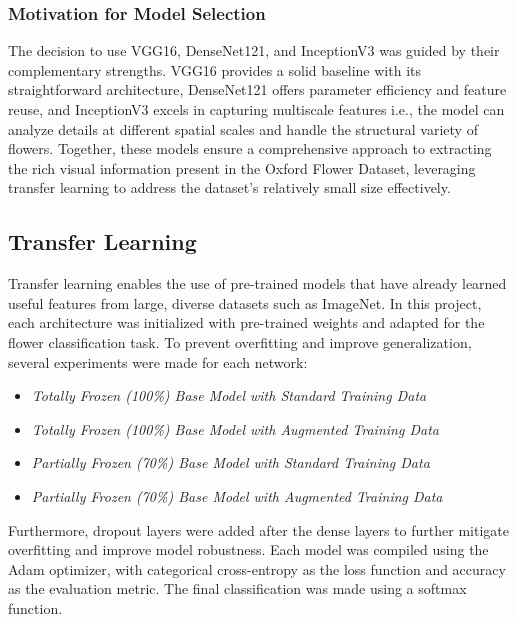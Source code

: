 \subsubsection*{Motivation for Model Selection}
The decision to use VGG16, DenseNet121, and InceptionV3 was guided by their complementary strengths. VGG16 provides a
solid baseline with its straightforward architecture, DenseNet121 offers parameter efficiency and feature reuse, and
InceptionV3 excels in capturing multiscale features i.e., the model can analyze details at different spatial scales and
handle the structural variety of flowers. Together, these models ensure a comprehensive approach to extracting the rich
visual information present in the Oxford Flower Dataset, leveraging transfer learning to address the dataset's relatively
small size effectively.

\subsection{Transfer Learning}

Transfer learning enables the use of pre-trained models that have already learned useful features from large, diverse
datasets such as ImageNet. In this project, each architecture was initialized with pre-trained weights and adapted for
the flower classification task. To prevent overfitting and improve generalization, several experiments were made for each network:

\begin{itemize}
    \item \textit{Totally Frozen (100\%) Base Model with Standard Training Data}
    \item \textit{Totally Frozen (100\%) Base Model with Augmented Training Data}
    \item \textit{Partially Frozen (70\%) Base Model with Standard Training Data}
    \item \textit{Partially Frozen (70\%) Base Model with Augmented Training Data}
\end{itemize}

Furthermore, dropout layers were added after the dense layers to further mitigate overfitting and improve model
robustness. Each model was compiled using the Adam optimizer, with categorical cross-entropy as the loss function and
accuracy as the evaluation metric. The final classification was made using a softmax function.


